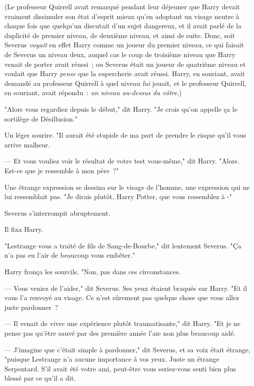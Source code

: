 (Le professeur Quirrell avait remarqué pendant leur déjeuner que Harry devait vraiment dissimuler son état d'esprit mieux qu'en adoptant un visage neutre à chaque fois que quelqu'un discutait d'un sujet dangereux, et il avait parlé de la duplicité de premier niveau, de deuxième niveau, et ainsi de suite. Donc, soit Severus \emph{voyait} en effet Harry comme un joueur du premier niveau, ce qui faisait de Severus un niveau deux, auquel cas le coup de troisième niveau que Harry venait de porter avait réussi~; ou Severus était un joueur de quatrième niveau et voulait que Harry \emph{pense} que la supercherie avait réussi. Harry, en souriant, avait demandé au professeur Quirrell à quel niveau \emph{lui} jouait, et le professeur Quirrell, en souriant, avait répondu~: \emph{un niveau au-dessus du vôtre}.)

"Alors vous regardiez depuis le début," dit Harry. "Je crois qu'on appelle ça le sortilège de Désillusion."

Un léger sourire. "Il aurait été stupide de ma part de prendre le risque qu'il vous arrive malheur.

--- Et vous vouliez voir le résultat de votre test vous-même," dit Harry. "Alors. Est-ce que je ressemble à mon père~?"

Une étrange expression se dessina sur le visage de l'homme, une expression qui ne lui ressemblait pas. "Je dirais plutôt, Harry Potter, que vous ressemblez à -"

Severus s'interrompit abruptement.

Il fixa Harry.

"Lestrange vous a traité de fils de Sang-de-Bourbe," dit lentement Severus. "Ça n'a pas eu l'air de beaucoup vous embêter."

Harry fronça les sourcils. "Non, pas dans ces circonstances.

--- Vous veniez de l'aider," dit Severus. Ses yeux étaient braqués sur Harry. "Et il vous l'a renvoyé au visage. Ce n'est sûrement pas quelque chose que vous allez juste pardonner~?

--- Il venait de vivre une expérience plutôt traumatisante," dit Harry. "Et je ne pense pas qu'être sauvé par des première année l'aie non plus beaucoup aidé.

--- J'imagine que c'était simple à pardonner," dit Severus, et sa voix était étrange, "puisque Lestrange n'a aucune importance à vos yeux. Juste un étrange Serpentard. S'il avait été votre ami, peut-être vous seriez-vous senti bien plus blessé par ce qu'il a dit.

